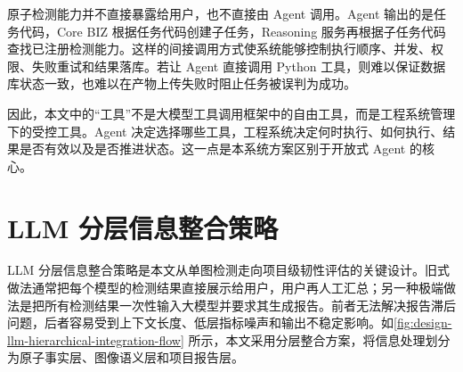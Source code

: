 原子检测能力并不直接暴露给用户，也不直接由 Agent 调用。Agent 输出的是任务代码，Core BIZ 根据任务代码创建子任务，Reasoning 服务再根据子任务代码查找已注册检测能力。这样的间接调用方式使系统能够控制执行顺序、并发、权限、失败重试和结果落库。若让 Agent 直接调用 Python 工具，则难以保证数据库状态一致，也难以在产物上传失败时阻止任务被误判为成功。

因此，本文中的“工具”不是大模型工具调用框架中的自由工具，而是工程系统管理下的受控工具。Agent 决定选择哪些工具，工程系统决定何时执行、如何执行、结果是否有效以及是否推进状态。这一点是本系统方案区别于开放式 Agent 的核心。

\section{LLM 分层信息整合策略}
\label{sec:design-large-language-model-hierarchical-information-integration-strategy}

LLM 分层信息整合策略是本文从单图检测走向项目级韧性评估的关键设计。旧式做法通常把每个模型的检测结果直接展示给用户，用户再人工汇总；另一种极端做法是把所有检测结果一次性输入大模型并要求其生成报告。前者无法解决报告滞后问题，后者容易受到上下文长度、低层指标噪声和输出不稳定影响。如\cref{fig:design-llm-hierarchical-integration-flow} 所示，本文采用分层整合方案，将信息处理划分为原子事实层、图像语义层和项目报告层。


